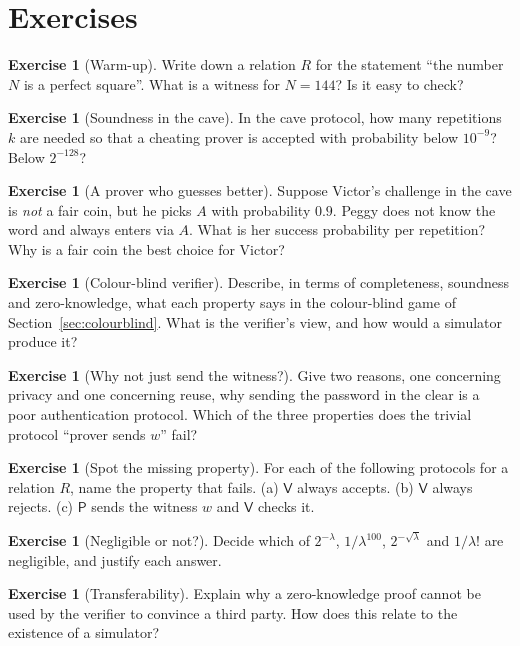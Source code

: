 \documentclass[11pt,a4paper]{report}
\theoremstyle{plain}
\theoremstyle{definition}
\newtheorem{exercise}[theorem]{Exercise}
\theoremstyle{remark}
\newcommand{\Prv}{\mathsf{P}}\newcommand{\Ver}{\mathsf{V}}
\begin{document}
\section*{Exercises}
\begin{exercise}[Warm-up]
Write down a relation $R$ for the statement ``the number $N$ is a perfect square''. What is a witness for $N=144$? Is it easy to check?
\end{exercise}
\begin{exercise}[Soundness in the cave]
In the cave protocol, how many repetitions $k$ are needed so that a cheating prover is accepted with probability below $10^{-9}$? Below $2^{-128}$?
\end{exercise}
\begin{exercise}[A prover who guesses better]
Suppose Victor's challenge in the cave is \emph{not} a fair coin, but he picks $A$ with probability $0.9$. Peggy does not know the word and always enters via $A$. What is her success probability per repetition? Why is a fair coin the best choice for Victor?
\end{exercise}
\begin{exercise}[Colour-blind verifier]
Describe, in terms of completeness, soundness and zero-knowledge, what each property says in the colour-blind game of Section~\ref{sec:colourblind}. What is the verifier's view, and how would a simulator produce it?
\end{exercise}
\begin{exercise}[Why not just send the witness?]
Give two reasons, one concerning privacy and one concerning reuse, why sending the password in the clear is a poor authentication protocol. Which of the three properties does the trivial protocol ``prover sends $w$'' fail?
\end{exercise}
\begin{exercise}[Spot the missing property]
For each of the following protocols for a relation $R$, name the property that fails.
(a) $\Ver$ always accepts. (b) $\Ver$ always rejects. (c) $\Prv$ sends the witness $w$ and $\Ver$ checks it.
\end{exercise}
\begin{exercise}[Negligible or not?]
Decide which of $2^{-\lambda}$, $1/\lambda^{100}$, $2^{-\sqrt{\lambda}}$ and $1/\lambda!$ are negligible, and justify each answer.
\end{exercise}
\begin{exercise}[Transferability]
Explain why a zero-knowledge proof cannot be used by the verifier to convince a third party. How does this relate to the existence of a simulator?
\end{exercise}
\end{document}

